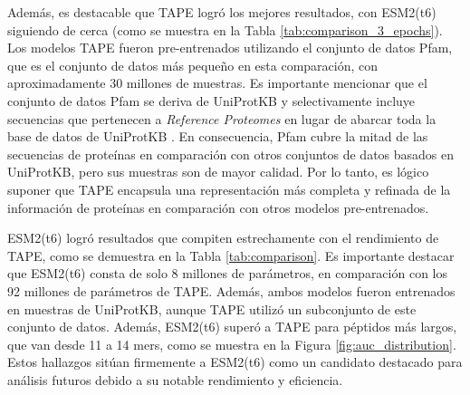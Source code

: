 Además, es destacable que TAPE logró los mejores resultados, con ESM2(t6) siguiendo de cerca (como se muestra en la Tabla \ref{tab:comparison_3_epochs}). Los modelos TAPE fueron pre-entrenados utilizando el conjunto de datos Pfam, que es el conjunto de datos más pequeño en esta comparación, con aproximadamente 30 millones de muestras. Es importante mencionar que el conjunto de datos Pfam se deriva de UniProtKB y selectivamente incluye secuencias que pertenecen a \textit{Reference Proteomes} en lugar de abarcar toda la base de datos de UniProtKB \cite{finn2016pfam}. En consecuencia, Pfam cubre la mitad de las secuencias de proteínas en comparación con otros conjuntos de datos basados en UniProtKB, pero sus muestras son de mayor calidad. Por lo tanto, es lógico suponer que TAPE encapsula una representación más completa y refinada de la información de proteínas en comparación con otros modelos pre-entrenados.


ESM2(t6) logró resultados que compiten estrechamente con el rendimiento de TAPE, como se demuestra en la Tabla \ref{tab:comparison}. Es importante destacar que ESM2(t6) consta de solo 8 millones de parámetros, en comparación con los 92 millones de parámetros de TAPE. Además, ambos modelos fueron entrenados en muestras de UniProtKB, aunque TAPE utilizó un subconjunto de este conjunto de datos. Además, ESM2(t6) superó a TAPE para péptidos más largos, que van desde 11 a 14 mers, como se muestra en la Figura \ref{fig:auc_distribution}. Estos hallazgos sitúan firmemente a ESM2(t6) como un candidato destacado para análisis futuros debido a su notable rendimiento y eficiencia.
